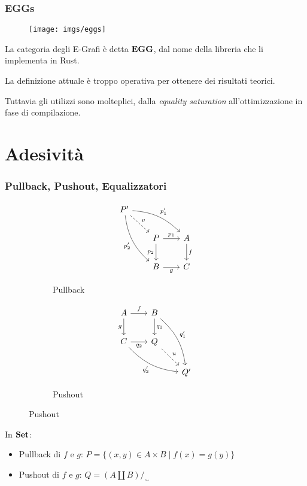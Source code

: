 \documentclass[8pt]{beamer}
\begin{document}
\begin{frame}\frametitle{EGGs}

	\begin{figure}
		\texttt{[image: imgs/eggs]}
	\end{figure}

	La categoria degli E-Grafi è detta $\mathbf{EGG}$, dal nome della libreria che li implementa in Rust.

	\smallskip

	La definizione attuale è troppo operativa per ottenere dei risultati teorici.

	\smallskip

	Tuttavia gli utilizzi sono molteplici, dalla \emph{equality saturation} all'ottimizzazione in fase di compilazione.
\end{frame}

\section{Adesività}

\begin{frame}[fragile]\frametitle{Pullback, Pushout, Equalizzatori}
	\begin{figure}[h]
		\begin{subfigure}{0.25\textwidth}
			\[\begin{tikzcd}[row sep = 20, column sep = 20]
				P' \arrow[dr, dashed, "v"] \arrow[drr, "{p_1'}", bend left=20] \arrow[ddr, "{p_2'}"swap, bend right=20] & & \\
 									& P \arrow[r, "{p_1}"] \arrow[d, "{p_2}"swap] 			& A \arrow[d, "f"] \\
									& B \arrow[r, "g"swap] 						& C
			\end{tikzcd}\]
			\caption{Pullback}
			\label{fig:pg}
		\end{subfigure}
		\qquad
		\begin{subfigure}{0.25\textwidth}
			\[\begin{tikzcd}[row sep = 20, column sep = 20]
				A \arrow[r, "f"] \arrow[d, "g"swap] 	& B \arrow[d, "{q_1}"] 	\arrow[ddr, "{q_1'}", bend left=20]	& \\
				C \arrow[r, "{q_2}"swap]  \arrow[drr, "{q_2'}"swap, bend right=20] & Q \arrow[dr, dashed, "u"] 	& \\
							& 				& Q'
			\end{tikzcd}\]
			\caption{Pushout}
			\label{po}
		\end{subfigure}
	\end{figure}

	In $\mathbf{Set}$:
	\begin{itemize}
		\item Pullback di $f$ e $g$: $ P = \{(x, y) \in A \times B \mid f(x) = g (y)\}$
		\item Pushout di $f$ e $g$:  $Q = (A \coprod B)/_\sim$
	\end{itemize}
\end{frame}
\end{document}
